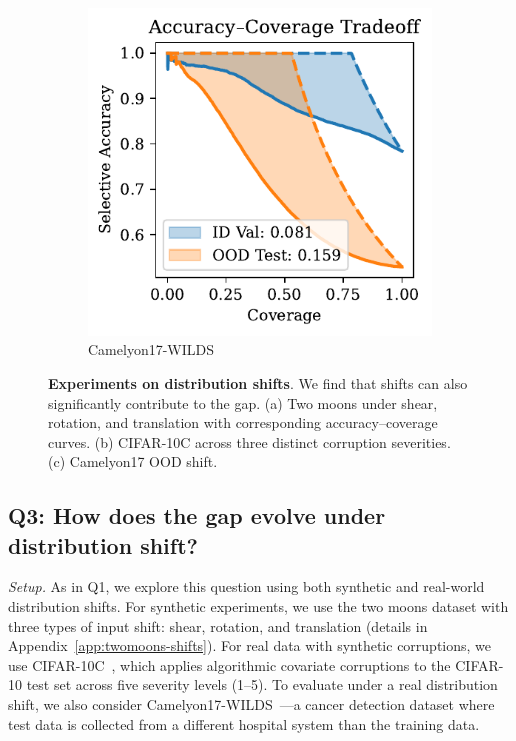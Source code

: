 \begin{figure}[t]
\begin{subfigure}[t]{0.24\textwidth}
    \includegraphics[width=\linewidth]{figs/sc_bounds/camelyon17_tradeoffs.pdf} 
    \caption{Camelyon17-WILDS}
    \label{fig:right}
  \end{subfigure}
  \caption[Experiments on distribution shifts.]{\textbf{Experiments on distribution shifts}. We find that shifts can also significantly contribute to the gap. (a) Two moons under shear, rotation, and translation with corresponding accuracy–coverage curves. (b) CIFAR-10C across three distinct corruption severities. (c) Camelyon17 OOD shift.}
  \label{fig:exp_ds}
\end{figure}

\subsection{Q3: How does the gap evolve under distribution shift?}

\emph{Setup.} As in Q1, we explore this question using both synthetic and real-world distribution shifts. For synthetic experiments, we use the two moons dataset with three types of input shift: shear, rotation, and translation (details in Appendix~\ref{app:twomoons-shifts}). For real data with synthetic corruptions, we use CIFAR-10C~\citep{hendrycks2019robustness}, which applies algorithmic covariate corruptions to the CIFAR-10 test set across five severity levels (1–5). To evaluate under a real distribution shift, we also consider Camelyon17-WILDS~\citep{koh2021wilds}---a cancer detection dataset where test data is collected from a different hospital system than the training data.

